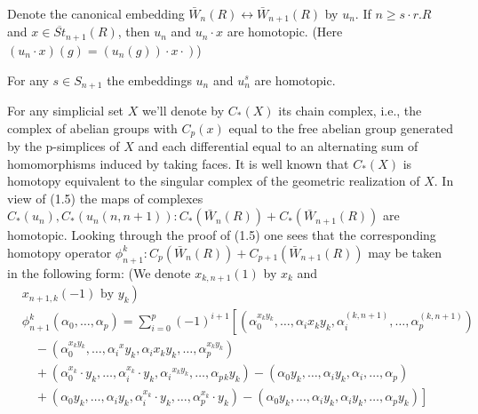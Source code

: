 \begin{lemm}
Denote the canonical embedding $\bar{W}_n(R) \longleftrightarrow \bar{W}_{n+1}(R)$ by $u_n$. If $n \geq s \cdot r . R$ and $x \in \overline{S t}_{n+1}(R)$, then $u_n$ and $u_n \cdot x$ are homotopic. (Here $\left.\left(u_n \cdot x\right)(g)=\left(u_n(g)\right) \cdot x \cdot\right)$)
\end{lemm}

\begin{lemm}
For any $s \in S_{n+1}$ the embeddings $u_n$ and $u_n^s$ are homotopic.   
\end{lemm}


For any simplicial set $X$ we'll denote by $C_*(X)$ its chain complex, i.e., the complex of abelian groups with $C_p(x)$ equal to the free abelian group generated by the p-simplices of $X$ and each differential equal to an alternating sum of homomorphisms induced by taking faces. It is well known that $C_*(X)$ is homotopy equivalent to the singular complex of the geometric realization of $X$. In view of (1.5) the maps of complexes $C_*\left(u_n\right), C_*\left(u_n(n, n+1)\right): C_*\left(\bar{W}_n(R)\right)+C_*\left(\bar{W}_{n+1}(R)\right)$ are homotopic. Looking through the proof of (1.5) one sees that the corresponding homotopy operator $\phi_{n+1}^k: C_p\left(\bar{W}_n(R)\right)+C_{p+1}\left(\bar{W}_{n+1}(R)\right)$ may be taken in the following form: (We denote $x_{k, n+1}(1)$ by $x_k$ and
$$
\begin{aligned}
& \left.x_{n+1, k}(-1) \text { by } y_k\right) \\
& \phi_{n+1}^k\left(\alpha_0, \ldots, \alpha_p\right)=\sum_{i=0}^p(-1)^{i+1}\left[\left(\alpha_0^{x_k y_k}, \ldots, \alpha_i x_k y_k, \alpha_i^{(k, n+1)}, \ldots, \alpha_p^{(k, n+1)}\right)\right. \\
& \quad-\left(\alpha_0^{x_k y_k}, \ldots, \alpha_i{ }^x y_k, \alpha_i x_k y_k, \ldots, \alpha_p^{x_k y_k}\right) \\
& \quad+\left(\alpha_0^{x_k} \cdot y_k, \ldots, \alpha_i^{x_k} \cdot y_k, \alpha_i{ }^{x_k y_k}, \ldots, \alpha_p{ }_k y_k\right)-\left(\alpha_0 y_k, \ldots, \alpha_i y_k, \alpha_i, \ldots, \alpha_p\right) \\
& \left.\quad+\left(\alpha_0 y_k, \ldots, \alpha_i y_k, \alpha_i^{x_k} \cdot y_k, \ldots, \alpha_p^{x_k} \cdot y_k\right)-\left(\alpha_0 y_k, \ldots, \alpha_i y_k, \alpha_i y_k, \ldots, \alpha_p y_k\right)\right]
\end{aligned}
$$


